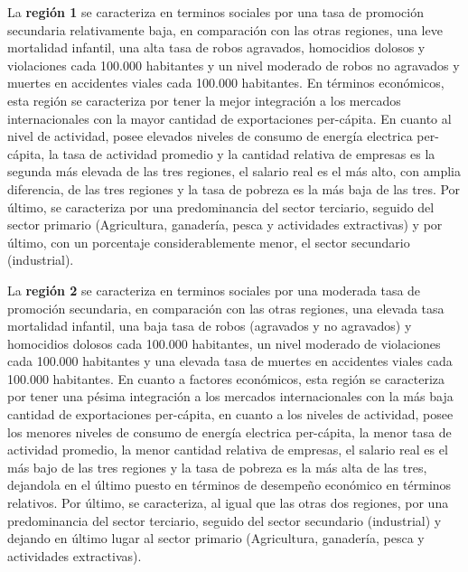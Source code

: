 \documentclass[12pt,a4paper]{article}
\begin{document}
La \textbf{región 1} se caracteriza en terminos sociales por una tasa de promoción secundaria relativamente baja, en comparación con las otras regiones, una leve mortalidad infantil, una alta tasa de robos agravados, homocidios dolosos y violaciones cada 100.000 habitantes y un nivel moderado de robos no agravados y muertes en accidentes viales cada 100.000 habitantes. En términos económicos, esta región se caracteriza por tener la mejor integración a los mercados internacionales con la mayor cantidad de exportaciones per-cápita. 
En cuanto al nivel de actividad, posee elevados niveles de consumo  de energía electrica per-cápita, la tasa de actividad promedio y la cantidad relativa de empresas es la segunda más elevada de las tres regiones, el salario real es el más alto, con amplia diferencia, de las tres regiones y la tasa de pobreza es la más baja de las tres. Por último, se caracteriza por una predominancia del sector terciario, seguido del sector primario (Agricultura, ganadería, pesca y actividades extractivas) y por último, con un porcentaje considerablemente menor, el sector secundario (industrial).

La \textbf{región 2} se caracteriza en terminos sociales por una moderada tasa de promoción secundaria, en comparación con las otras regiones, una elevada tasa mortalidad infantil, una baja tasa de robos (agravados y no agravados) y homocidios dolosos cada 100.000 habitantes, un nivel moderado de violaciones cada 100.000 habitantes y una elevada tasa de muertes en accidentes viales cada 100.000 habitantes. 
En cuanto a factores económicos, esta región se caracteriza por tener una pésima integración a los mercados internacionales con la más baja cantidad de exportaciones per-cápita, en cuanto a los niveles de actividad, posee los menores niveles de consumo  de energía electrica per-cápita, la menor tasa de actividad promedio, la menor cantidad relativa de empresas, el salario real es el más bajo de las tres regiones y la tasa de pobreza es la más alta de las tres, dejandola en el último puesto en términos de desempeño económico en términos relativos. 
Por último, se caracteriza, al igual que las otras dos regiones, por una predominancia del sector terciario, seguido del sector secundario (industrial) y dejando en último lugar al sector primario (Agricultura, ganadería, pesca y actividades extractivas).
\end{document}
